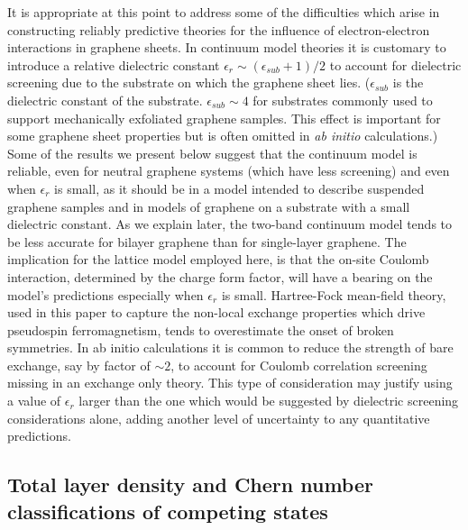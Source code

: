 \documentclass[twocolumn,prb,showpacs,preprintnumbers,amsmath,amssymb]{revtex4}
\begin{document}
It is appropriate at this point to address some of the 
difficulties which arise in constructing reliably predictive theories for the influence of 
electron-electron interactions in graphene sheets.  In continuum model 
theories it is customary to introduce a relative dielectric constant 
$\epsilon_r \sim (\epsilon_{sub}+1)/2$ to account for dielectric screening due
to the substrate on which the graphene sheet lies.  ($\epsilon_{sub}$ is the 
dielectric constant of the substrate.  $\epsilon_{sub} \sim 4$ for 
substrates commonly used to support mechanically exfoliated graphene samples.  
This effect is important for some graphene sheet properties but is often
omitted in {\em ab initio} calculations.)
Some of the results we present below suggest that 
the continuum model is reliable, even for neutral 
graphene systems (which have less screening) and even when $\epsilon_r$ is small, as 
it should be in a model intended to describe suspended graphene samples and in models of graphene on a substrate with a 
small dielectric constant.  As we explain later, the two-band continuum model tends to be
less accurate for bilayer graphene than for single-layer graphene.
The implication for the lattice model
employed here, is that the on-site Coulomb interaction, determined by the charge form factor, 
will have a bearing on the model's predictions especially when $\epsilon_r$ is small.
Hartree-Fock mean-field theory, used in this paper to capture the non-local 
exchange properties which drive pseudospin ferromagnetism,
tends to overestimate the onset of broken symmetries.  In ab initio calculations 
it is common\cite{xalpha} to reduce the strength of bare exchange, say by factor of $\sim 2$,
to account for Coulomb correlation screening missing in an exchange only theory.  
This type of consideration may justify using a value of $\epsilon_r$ larger than 
the one which would be suggested by dielectric screening considerations alone, adding another 
level of uncertainty to any quantitative predictions.

\subsection{Total layer density and Chern number classifications of competing states}
\end{document}
